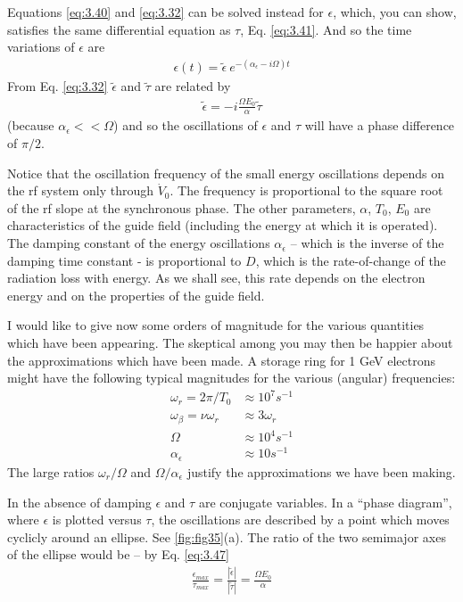 Equations \eqref{eq:3.40} and \eqref{eq:3.32} can be solved instead for $\epsilon$, which, you can show, satisfies the same differential equation as $\tau$, Eq. \eqref{eq:3.41}. And so the time variations of $\epsilon$ are
\begin{align}
	\epsilon(t) = \tilde{\epsilon}\ e^{-(\alpha_\epsilon - i\Omega)t}
\end{align}
From Eq. \eqref{eq:3.32} $\tilde{\epsilon}$ and $\tilde{\tau}$ are related by
\begin{align}
	\tilde{\epsilon} = -i\frac{\Omega E_0}{\alpha}\tilde{\tau}\label{eq:3.47}
\end{align}
(because $\alpha_\epsilon << \Omega$) and so the oscillations of $\epsilon$ and $\tau$ will have a phase difference of $\pi/2$.

Notice that the oscillation frequency of the small energy oscillations depends on the rf system only through $\dot{V}_0$. The frequency is proportional to the square root of the rf slope at the synchronous phase. The other parameters, $\alpha$, $T_0$, $E_0$ are characteristics of the guide field (including the energy at which it is operated). The damping constant of the energy oscillations $\alpha_\epsilon$ -- which is the inverse of the damping time constant - is proportional to $D$, which is the rate-of-change of the radiation loss with energy. As we shall see, this rate depends on the electron energy and on the properties of the guide field.

I would like to give now some orders of magnitude for the various quantities which have been appearing. The skeptical among you may then be happier about the approximations which have been made. A storage ring for 1 GeV electrons might have the following typical magnitudes for the various (angular) frequencies:
\begin{align*}
	\omega_r = 2\pi /T_0 &\approx 10^7 s^{-1}\\
	\omega_\beta = \nu \omega_r &\approx 3\omega_r\\
	\Omega &\approx 10^4 s^{-1}\\
	\alpha_\epsilon &\approx 10 s^{-1}
\end{align*}
The large ratios $\omega_r/\Omega$ and $\Omega/\alpha_\epsilon$ justify the approximations we have been making.

In the absence of damping $\epsilon$ and $\tau$ are conjugate variables. In a ``phase diagram'', where $\epsilon$ is plotted versus $\tau$, the oscillations are described by a point which moves cyclicly around an ellipse. See \autoref{fig:fig35}(a). The ratio of the two semimajor axes of the ellipse would be -- by Eq. \eqref{eq:3.47}
\begin{align}
	\frac{\epsilon_{max}}{\tau_{max}} = \frac{|\tilde{\epsilon}|}{|\tilde{\tau}|} = \frac{\Omega E_0}{\alpha}
\end{align}

